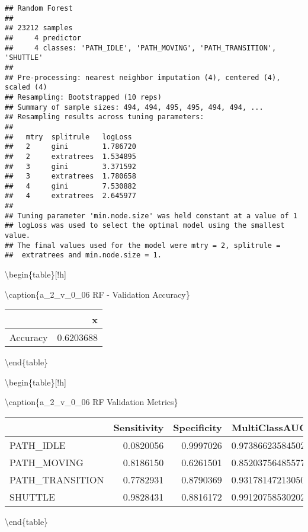 \documentclass[]{article}
\begin{document}
\begin{verbatim}
## Random Forest 
## 
## 23212 samples
##     4 predictor
##     4 classes: 'PATH_IDLE', 'PATH_MOVING', 'PATH_TRANSITION', 'SHUTTLE' 
## 
## Pre-processing: nearest neighbor imputation (4), centered (4), scaled (4) 
## Resampling: Bootstrapped (10 reps) 
## Summary of sample sizes: 494, 494, 495, 495, 494, 494, ... 
## Resampling results across tuning parameters:
## 
##   mtry  splitrule   logLoss 
##   2     gini        1.786720
##   2     extratrees  1.534895
##   3     gini        3.371592
##   3     extratrees  1.780658
##   4     gini        7.530882
##   4     extratrees  2.645977
## 
## Tuning parameter 'min.node.size' was held constant at a value of 1
## logLoss was used to select the optimal model using the smallest value.
## The final values used for the model were mtry = 2, splitrule =
##  extratrees and min.node.size = 1.
\end{verbatim}

\textbackslash{}begin\{table\}{[}!h{]}

\textbackslash{}caption\{\label{tab:a_2_v_0_06-rf-params}a\_2\_v\_0\_06
RF - Validation Accuracy\} \centering

\begin{tabular}[t]{lr}
\toprule
  & x\\
\midrule
Accuracy & 0.6203688\\
\bottomrule
\end{tabular}

\textbackslash{}end\{table\}

\textbackslash{}begin\{table\}{[}!h{]}

\textbackslash{}caption\{\label{tab:a_2_v_0_06-rf-params}a\_2\_v\_0\_06
RF Validation Metrics\} \centering

\begin{tabular}[t]{lrrl}
\toprule
  & Sensitivity & Specificity & MultiClassAUC\\
\midrule
PATH\_IDLE & 0.0820056 & 0.9997026 & 0.973866235845022\\
PATH\_MOVING & 0.8186150 & 0.6261501 & 0.852037564855777\\
PATH\_TRANSITION & 0.7782931 & 0.8790369 & 0.931781472130508\\
SHUTTLE & 0.9828431 & 0.8816172 & 0.991207585302024\\
\bottomrule
\end{tabular}

\textbackslash{}end\{table\}
\end{document}
